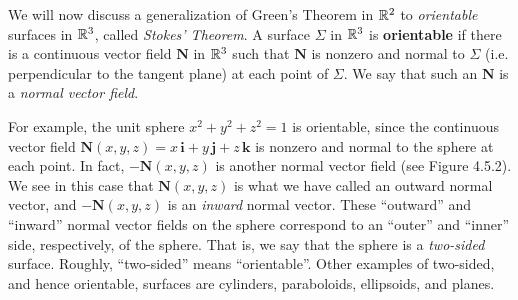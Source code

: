 We will now discuss a generalization of Green's Theorem in $\mathbb{R}^{2}$ to \emph{orientable} surfaces in $\mathbb{R}^{3}$,
called \emph{Stokes' Theorem}. A surface $\Sigma$ in
$\mathbb{R}^{3}$ is \textbf{orientable} if there is a continuous vector field $\mathbf{N}$ in $\mathbb{R}^{3}$ such that
$\mathbf{N}$ is nonzero and normal to $\Sigma$ (i.e. perpendicular to the tangent plane) at each point of $\Sigma$. We say
that such an $\mathbf{N}$ is a \emph{normal vector field}.

\piccaption[]{}
For example, the unit sphere $x^2 + y^2 + z^2 = 1$ is orientable, since the continuous vector field
$\mathbf{N}(x,y,z) = x\,\mathbf{i} + y\,\mathbf{j} + z\,\mathbf{k}$ is nonzero and normal to the sphere at each point.
In fact, $-\mathbf{N}(x,y,z)$ is another normal vector field (see Figure 4.5.2). We see in this case that
$\mathbf{N}(x,y,z)$ is what we have called an outward normal vector, and $-\mathbf{N}(x,y,z)$ is an \emph{inward} normal
vector. These ``outward'' and ``inward'' normal vector fields on the sphere correspond to an ``outer'' and
``inner'' side, respectively, of the sphere.
That is, we say that the sphere is a \emph{two-sided} surface.
Roughly, ``two-sided'' means ``orientable''.
Other examples of two-sided, and hence orientable, surfaces are
cylinders, paraboloids, ellipsoids, and planes.

